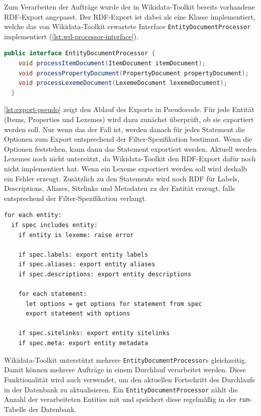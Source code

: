 Zum Verarbeiten der Aufträge wurde der in Wikidata-Toolkit bereits vorhandene RDF-Export angepasst.
Der RDF-Export ist dabei als eine Klasse implementiert, welche das von Wikidata-Toolkit erwartete Interface \verb|EntityDocumentProcessor| implementiert (\cref{lst:wd-processor-interface}).

\begin{lstlisting}[language=Java, caption={EntityDocumentProcessor Interface}, label={lst:wd-processor-interface}]
  public interface EntityDocumentProcessor {
    void processItemDocument(ItemDocument itemDocument);
    void processPropertyDocument(PropertyDocument propertyDocument);
    void processLexemeDocument(LexemeDocument lexemeDocument);
  }
\end{lstlisting}

\cref{lst:export-pseudo} zeigt den Ablauf des Exports in Pseudocode.
Für jede Entität (Items, Properties und Lexemes) wird dazu zunächst überprüft, ob sie exportiert werden soll.
Nur wenn das der Fall ist, werden danach für jedes Statement die Optionen zum Export entsprechend der Filter-Spezifikation bestimmt. 
Wenn die Optionen feststehen, kann dann das Statement exportiert werden.
Aktuell werden Lexemes noch nicht untersützt, da Wikidata-Toolkit den RDF-Export dafür noch nicht implementiert hat.
Wenn ein Lexeme exportiert werden soll wird deshalb ein Fehler erzeugt.
Zusätzlich zu den Statements wird noch RDF für Labels, Descriptions, Aliases, Sitelinks und Metadaten zu der Entität erzeugt, falls entsprechend der Filter-Spezifikation verlangt.

\begin{lstlisting}[keywords={for,each,if,let}, caption={Export Pseudocode}, label={lst:export-pseudo}]
for each entity:
  if spec includes entity:
    if entity is lexeme: raise error
  
    if spec.labels: export entity labels
    if spec.aliases: export entity aliases
    if spec.descriptions: export entity descriptions

    for each statement:
      let options = get options for statement from spec
      export statement with options

    if spec.sitelinks: export entity sitelinks
    if spec.meta: export entity metadata
\end{lstlisting}

Wikidata-Toolkit unterstützt mehrere \verb|EntityDocumentProcessor|s gleichzeitig.
Damit können mehrere Aufträge in einem Durchlauf verarbeitet werden. 
Diese Funktionalität wird auch verwendet, um den aktuellen Fortschritt des Durchlaufs in der Datenbank zu aktualisieren.
Ein \verb|EntityDocumentProcessor| zählt die Anzahl der verarbeiteten Entities mit und speichert diese regelmäßig in der \verb|run|-Tabelle der Datenbank.

